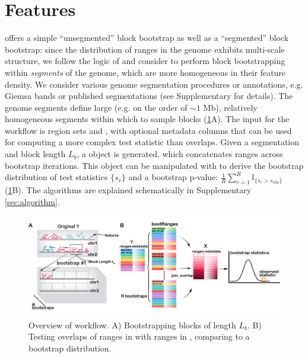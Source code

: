 \section{Features}

\bootranges offers a simple ``unsegmented'' block bootstrap as well as
a ``segmented'' block bootstrap:
since the distribution of ranges in the genome exhibits multi-scale
structure, we follow the logic of \citet{bickel2010subsampling} and consider to
perform block bootstrapping within \textit{segments} of the genome, which are
more homogeneous in their feature density.
We consider various genome segmentation procedures
or annotations, e.g. Giemsa bands or published segmentations
(see Supplementary for details).
The genome segments define large (e.g. on the order of ${\sim}1$ Mb),
relatively homogeneous segments within which to sample blocks
(\cref{fig:framework}A). 
The input for the workflow is region sets  and
, with optional metadata columns that can be
used for computing a more complex test statistic than overlaps.
Given a segmentation and block length $L_b$, a \bootranges
object is generated, which concatenates ranges across bootstrap
iterations. This \bootranges object can be manipulated with \plyranges
to derive the bootstrap distribution of test statistics $\{s_r\}$ and a
bootstrap p-value:
$ \frac{1}{R} \sum_{r=1}^R \mathbb{I}_{\{s_r > s_\text{obs}\}} $ (\cref{fig:framework}B).
The \bootranges algorithms are explained schematically in Supplementary \cref{sec:algorithm}.

\begin{figure}[t]
\centering%
\setlength{\abovecaptionskip}{-0.05cm}
\includegraphics[scale=0.65]{Figures/bootRanges.jpg}
\caption{Overview of \bootranges workflow.
  A) Bootstrapping blocks of length $L_b$.
  B) Testing overlaps of ranges in  with ranges in
  , comparing to a bootstrap distribution.} 
\label{fig:framework}
\vspace{-0.5cm}
\end{figure}

